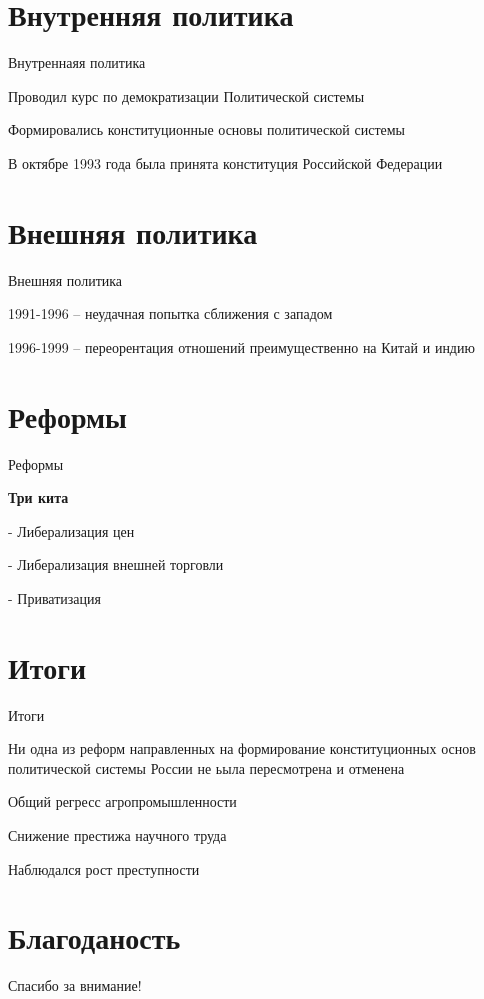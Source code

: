 \section{Внутренняя политика}
\begin{frame}{Внутреннаяя политика}

	Проводил курс по демократизации Политической системы

	Формировались конституционные основы политической системы

	В октябре 1993 года была принята конституция Российской Федерации

\end{frame}


\section{Внешняя политика}
\begin{frame}{Внешняя политика}

	1991-1996 -- неудачная попытка сближения с западом

	1996-1999 -- переорентация отношений преимущественно на Китай и индию

\end{frame}


\section{Реформы}
\begin{frame}{Реформы}

	\textbf{Три кита}

	- Либерализация цен

	- Либерализация внешней торговли

	- Приватизация

\end{frame}


\section{Итоги}
\begin{frame}{Итоги}

	Ни одна из реформ направленных на формирование конституционных основ политической системы России не ьыла пересмотрена и отменена

	Общий регресс агропромышленности

	Снижение престижа научного труда

	Наблюдался рост преступности
\end{frame}


\section{Благоданость}
\begin{frame}
	\centering
	\huge
	Спасибо за внимание!
\end{frame}



